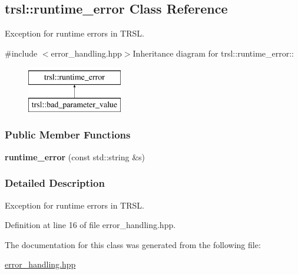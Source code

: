 \hypertarget{classtrsl_1_1runtime__error}{
\subsection{trsl::runtime\_\-error Class Reference}
\label{classtrsl_1_1runtime__error}
}


Exception for runtime errors in TRSL.  


{\ttfamily \#include $<$error\_\-handling.hpp$>$}Inheritance diagram for trsl::runtime\_\-error::\begin{figure}[H]
\begin{center}
\leavevmode
\includegraphics[height=2cm]{classtrsl_1_1runtime__error}
\end{center}
\end{figure}
\subsubsection*{Public Member Functions}
\begin{DoxyCompactItemize}
\item 
\hypertarget{classtrsl_1_1runtime__error_ad9d2495f2d0d220353ff26c9886625e4}{
{\bfseries runtime\_\-error} (const std::string \&s)}
\label{classtrsl_1_1runtime__error_ad9d2495f2d0d220353ff26c9886625e4}

\end{DoxyCompactItemize}


\subsubsection{Detailed Description}
Exception for runtime errors in TRSL. 

Definition at line 16 of file error\_\-handling.hpp.

The documentation for this class was generated from the following file:\begin{DoxyCompactItemize}
\item 
\hyperlink{error__handling_8hpp}{error\_\-handling.hpp}\end{DoxyCompactItemize}
